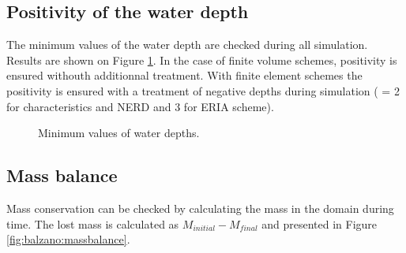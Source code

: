 


\subsection{Positivity of the water depth}

The minimum values of the water depth are checked during all simulation.
Results are shown on Figure \ref{t2d:balzano:minmax}.
In the case of finite volume schemes, positivity is ensured withouth additionnal
treatment.
With finite element schemes the positivity is ensured with a treatment of
negative depths during simulation ( = 2
for characteristics and NERD and 3 for ERIA scheme).

\begin{figure}[H]
\centering
{}
\caption{Minimum values of water depths.}
\label{t2d:balzano:minmax}
\end{figure}

\subsection{Mass balance}

Mass conservation can be checked by calculating the mass in the domain during time. The lost mass is calculated as
$M_{initial} - M_{final}$ and presented in Figure \ref{fig:balzano:massbalance}.

